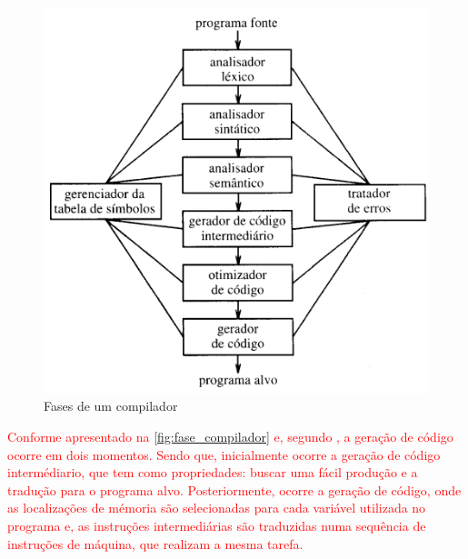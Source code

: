 \begin{figure}[H]
	\begin{center}
    \caption{\label{fig:fase_compilador}Fases de um compilador}
	\includegraphics[scale=0.70]{Figuras/fase_compilador.png}
	\end{center}
\end{figure}

\par
\textcolor{red}{Conforme apresentado na \autoref{fig:fase_compilador} e, segundo , a geração de código ocorre em dois momentos. Sendo que, inicialmente ocorre a geração de código intermédiario, que tem como propriedades: buscar uma fácil produção e a tradução para o programa alvo. Posteriormente, ocorre a geração de código, onde as localizações de mémoria são selecionadas para cada variável utilizada no programa e, as instruções intermediárias são traduzidas numa sequência de instruções de máquina, que realizam a mesma tarefa.}